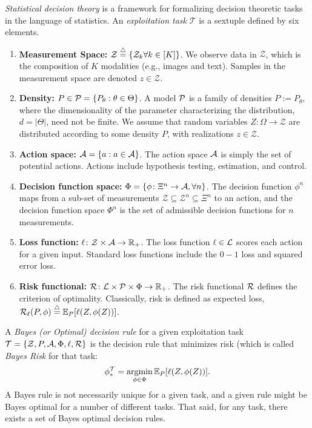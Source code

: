 \documentclass{article}
\begin{document}
\emph{Statistical decision theory} is a framework for formalizing decision theoretic tasks in the language of statistics.  An \emph{exploitation task} $\mathcal{T}$ is a sextuple defined by six elements.
\begin{enumerate}
  \item \textbf{Measurement Space:} $\mathcal{Z} \overset{\triangle}{=} \{ \mathcal{Z}_k \forall k \in [K]\}$. We observe data in $\mathcal{Z}$, which is the composition of  $K$ modalities (e.g., images and text).  Samples in the measurement space are denoted  $z \in \mathcal{Z}$.  
	\item \textbf{Density:} $P \in \mathcal{P}=\{P_{\theta}: \theta \in \Theta\}$.  A model $\mathcal{P}$ is a family of densities $P := P_{\theta}$, where the dimensionality of the parameter characterizing the distribution, $d=|\Theta|$, need not be finite.     We assume that random variables $Z \colon \Omega \to \mathcal{Z}$  are distributed according to some density $P$, with realizations $z \in \mathcal{Z}$.
	\item \textbf{Action space:} $\mathcal{A}=\{a : a \in \mathcal{A}\}$.  The action space $\mathcal{A}$ is simply the set of potential actions.  Actions  include hypothesis testing, estimation, and control. 
	\item \textbf{Decision function space:} $\Phi = \{\phi \colon \Xi^n \to \mathcal{A}, \forall n \}$. The decision function $\phi^n$ maps from a sub-set of measurements $\mathcal{Z} \subseteq \mathcal{Z}^n \subseteq \Xi^n$ to an action, and the decision function space $\Phi^n$ is the set of admissible decision functions for $n$ measurements.
	\item \textbf{Loss function:} $\ell \colon \mathcal{Z} \times \mathcal{A} \to \mathbb{R}_+$.  The loss function $\ell \in \mathcal{L}$ scores each action for a given input.  Standard loss functions include the $0-1$ loss and squared error loss. 
	\item \textbf{Risk functional:} $\mathcal{R} \colon \mathcal{L} \times \mathcal{P} \times \Phi \to \mathbb{R}_+$.	The risk functional $\mathcal{R}$ defines the criterion of optimality.  Classically, risk is defined as expected loss, $\mathcal{R}_\ell(P,\phi) \overset{\triangle}{=} \mathbb{E}_P[\ell(Z,\phi(Z))]$.
\end{enumerate}

\noindent  A \emph{Bayes (or Optimal) decision rule} for a given exploitation task $\mathcal{T}=\{\mathcal{Z}, P, \mathcal{A}, \Phi, \ell, \mathcal{R}\}$ is the decision rule that minimizes risk (which is called \emph{Bayes Risk} for that task: 
\begin{align}
    \phi_*^\mathcal{T} = \argmin_{\phi \in \Phi} \EE_P [\ell(Z, \phi(Z))].
\end{align}
A Bayes rule is not necessarily unique for a given task, and a given rule might be Bayes optimal for a number of different tasks.  That said, for any task, there exists a set of Bayes optimal decision rules.  
\end{document}
